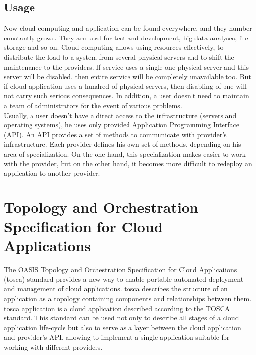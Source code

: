 \subsection*{Usage}
Now cloud computing and application can be found everywhere, and they number constantly grows. \cite*{cloud_stat}
They are used for test and development, big data analyses, file storage and so on.
Cloud computing allows using resources effectively, to distribute the load to a system from several physical servers and to shift the maintenance to the providers. 
If service uses a single one physical server and this server will be disabled, then entire service will be completely unavailable too.
But if cloud application uses a hundred of physical servers, then disabling of one will not carry such serious consequences.
In addition, a user doesn't need to maintain a team of administrators for the event of various problems.\\
Usually, a user doesn't have a direct access to the infrastructure (servers and operating systems), he uses only provided Application Programming Interface (API).
An API provides a set of methods to communicate with provider's infrastructure. 
Each provider defines his own set of methods, depending on his area of specialization. 
On the one hand, this specialization makes easier to work with the provider, but on the other hand, it becomes more difficult to redeploy an application to another provider.

\section{Topology and Orchestration Specification for Cloud	Applications} \label{sec:tosca}
The OASIS \cite{oasis} Topology and Orchestration Specification for Cloud Applications (\gls{tosca}) standard provides a new way to enable portable automated deployment and management of cloud applications.
\gls{tosca} describes the structure of an application as a topology containing components and relationships between them.
\gls{tosca} application is a cloud application described according to the TOSCA standard.
This standard can be used not only to describe all stages of a cloud application life-cycle but also to serve as a layer between the cloud application and provider's API, allowing to implement a single application suitable for working with different providers. 
